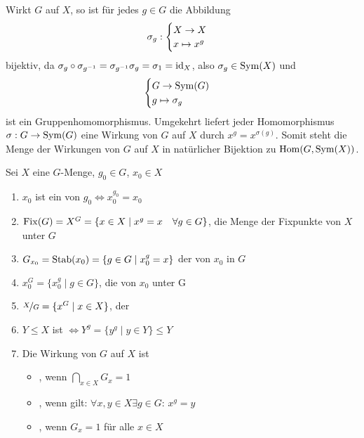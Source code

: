 \begin{remark}
	Wirkt $G$ auf $X$, so ist für jedes $g\in G$ die Abbildung
	\begin{align}
		\sigma_g: \begin{cases}
			X\to X \\ x\mapsto x^g
		\end{cases} \notag
	\end{align}
	bijektiv, da $\sigma_g\circ\sigma_{g^{-1}}=\sigma_{g^{-1}}\sigma_g=\sigma_1=\operatorname{id}_X$, also $\sigma_g\in\operatorname{Sym}(X)$ und
	\begin{align}
		\begin{cases}
			G\to \operatorname{Sym}(G) \\ g\mapsto \sigma_g
		\end{cases}\notag
	\end{align}
	ist ein Gruppenhomomorphismus. Umgekehrt liefert jeder Homomorphismus $\sigma: G\to\operatorname{Sym}(G)$ eine Wirkung von $G$ auf $X$ durch $x^g=x^{\sigma(g)}$. Somit steht die Menge der Wirkungen von $G$ auf $X$ in natürlicher Bijektion zu $\operatorname{Hom}(G,\operatorname{Sym}(X))$.
\end{remark}

\begin{definition}
	Sei $X$ eine $G$-Menge, $g_0\in G$, $x_0\in X$
	\begin{enumerate}[label=(\alph*)]
		\item $x_0$ ist ein  von $g_0\Leftrightarrow x_0^{g_0}=x_0$
		\item $\operatorname{Fix}(G) = X^G = \{x\in X\mid x^g=x\quad\forall g\in G\}$, die Menge der Fixpunkte von $X$ unter $G$
		\item $G_{x_0} = \operatorname{Stab}(x_0) = \{g\in G\mid x_0^g = x\}$ der  von $x_0$ in $G$
		\item $x_0^G = \{x_0^g \mid g\in G\}$, die  von $x_0$ unter G
		\item $\nicefrac{X}{G} = \{x^G\mid x\in X\}$, der 
		\item $Y\le X$ ist  $\Leftrightarrow Y^g = \{y^g\mid y\in Y\}\le Y$
		\item Die Wirkung von $G$ auf $X$ ist
		\begin{itemize}
			\item {}, wenn $\bigcap_{x\in X} G_x=1$
			\item {}, wenn gilt: $\forall x,y\in X\exists g\in G$: $x^g=y$
			\item {}, wenn $G_x=1$ für alle $x\in X$
		\end{itemize}
	\end{enumerate}
\end{definition}

